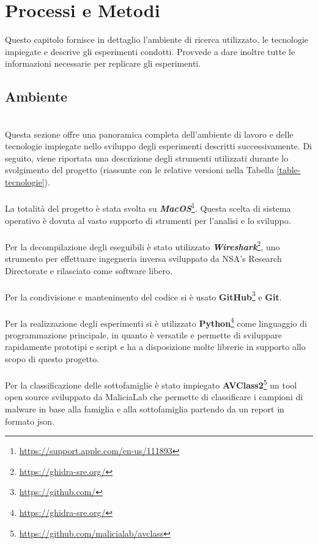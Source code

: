 \chapter{Processi e Metodi}
\label{cap:processi-metodologie}

Questo capitolo fornisce in dettaglio l'ambiente di ricerca utilizzato, le tecnologie impiegate e descrive gli esperimenti condotti. 
Provvede a dare inoltre tutte le informazioni necessarie per replicare gli esperimenti.

\section{Ambiente}
~\\
\indent Questa sezione offre una panoramica completa dell'ambiente di lavoro e delle tecnologie impiegate nello sviluppo degli esperimenti descritti successivamente. 
Di seguito, viene riportata una descrizione degli strumenti utilizzati durante lo svolgimento del progetto (riassunte con le relative versioni nella Tabella \ref{table-tecnologie}).
\\\\
La totalità del progetto è stata svolta su \textbf{\emph{MacOS}}\footnote{\url{https://support.apple.com/en-us/111893}}. 
Questa scelta di sistema operativo è dovuta al vasto supporto di strumenti per l'analisi e lo sviluppo.
\\\\
Per la decompilazione degli eseguibili è stato utilizzato \textbf{\emph{Wireshark}}\footnote{\url{https://ghidra-sre.org/}}, 
uno strumento per effettuare ingegneria inversa sviluppato da NSA's Research Directorate e rilasciato come software libero.
\\\\
Per la condivisione e mantenimento del codice si è usato \textbf{GitHub}\footnote{\url{https://github.com/}} e \textbf{Git}.
\\\\
Per la realizzazione degli esperimenti si è utilizzato \textbf{Python}\footnote{\url{https://ghidra-sre.org/}} come linguaggio di programmazione principale, in quanto è versatile e permette di sviluppare rapidamente prototipi e script e ha a disposizione molte librerie in supporto allo scopo di questo progetto.
\\\\
Per la classificazione delle sottofamiglie è stato impiegato \textbf{AVClass2}\footnote{\url{https://github.com/malicialab/avclass}}
un tool open source sviluppato da MaliciaLab che permette di classificare i campioni di malware in base alla famiglia e alla sottofamiglia partendo da un report in formato json.
